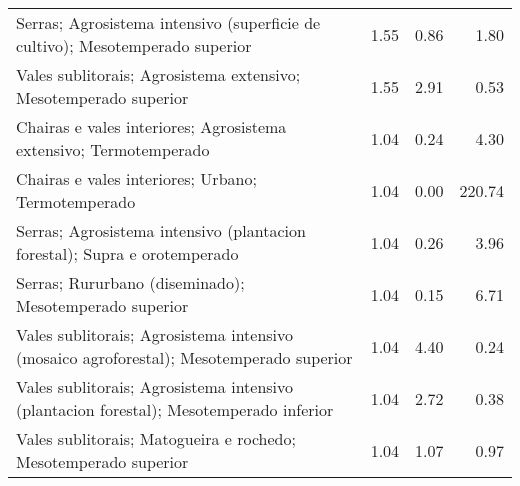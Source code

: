 \begin{table}[p]
\begin{tabular}{lrrr}
  Serras; Agrosistema intensivo (superficie de cultivo); Mesotemperado superior & 1.55 & 0.86 & 1.80 \\ 
  Vales sublitorais; Agrosistema extensivo; Mesotemperado superior & 1.55 & 2.91 & 0.53 \\ 
  Chairas e vales interiores; Agrosistema extensivo; Termotemperado & 1.04 & 0.24 & 4.30 \\ 
  Chairas e vales interiores; Urbano; Termotemperado & 1.04 & 0.00 & 220.74 \\ 
  Serras; Agrosistema intensivo (plantacion forestal); Supra e orotemperado & 1.04 & 0.26 & 3.96 \\ 
  Serras; Rururbano (diseminado); Mesotemperado superior & 1.04 & 0.15 & 6.71 \\ 
  Vales sublitorais; Agrosistema intensivo (mosaico agroforestal); Mesotemperado superior & 1.04 & 4.40 & 0.24 \\ 
  Vales sublitorais; Agrosistema intensivo (plantacion forestal); Mesotemperado inferior & 1.04 & 2.72 & 0.38 \\ 
  Vales sublitorais; Matogueira e rochedo; Mesotemperado superior & 1.04 & 1.07 & 0.97 \\ 
   \hline
\end{tabular}
\end{table}
